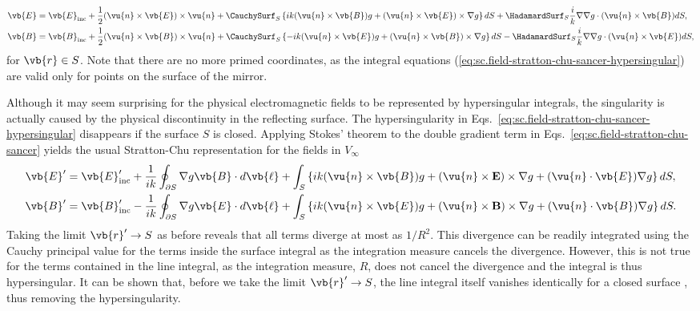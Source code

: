 \documentclass[11pt,SymmetricalJury]{inrsthesis/inrsthesis}
\begin{document}
  \begin{subequations}
  \label{eq:sc.field-stratton-chu-sancer-hypersingular}
  \begin{align}
  \label{eq:sc.efield-stratton-chu-sancer-hypersingular}
  \vb{E} &= \vb{E}_\text{inc}+ \frac{1}{2}(\vu{n}\times\vb{E})\times\vu{n}
          +\CauchySurf_S
            \left\{ ik(\vu{n}\times \vb{B})              g
                    +   (\vu{n}\times \vb{E})\times \nabla g\right\}dS
          +\HadamardSurf_S\frac{i}{k}\nabla\nabla g\cdot(\vu{n}\times\vb{B}) dS,\\
  \label{eq:sc.bfield-stratton-chu-sancer-hypersingular}
  \vb{B}
      &= \vb{B}_\text{inc} + \frac{1}{2}(\vu{n}\times\vb{B})\times\vu{n}
      +\CauchySurf_S
        \left\{-ik(\vu{n}\times \vb{E})g +(\vu{n}\times \vb{B})\times \nabla g\right\}dS
      -\HadamardSurf_S\frac{i}{k}\nabla\nabla g\cdot(\vu{n}\times\vb{E})dS,
  \end{align}
  \end{subequations}
for $\vb{r}\in S$. Note that there are no more primed coordinates, as the integral
equations (\ref{eq:sc.field-stratton-chu-sancer-hypersingular})
are valid only for points on the surface of the mirror.

Although it may seem surprising for the
physical electromagnetic fields to be represented by hypersingular integrals,
the singularity is actually caused by the physical discontinuity in the reflecting surface.
The hypersingularity in Eqs.~\eqref{eq:sc.field-stratton-chu-sancer-hypersingular}
disappears if the surface $S$ is closed. Applying Stokes' theorem to the double gradient
term in Eqs.~\eqref{eq:sc.field-stratton-chu-sancer} yields the usual Stratton-Chu
representation for the fields in $V_\infty$
  \begin{subequations}
  \label{eq:sc.field.stratton-chu}
  \begin{align}
    \vb{E}'   &= \vb{E}_\text{inc}'+\frac{1}{ik}\oint_{\partial S} \nabla g \vb{B}\cdot d\vb{\ell}
                  + \int_S\left\{ ik(\vu{n}\times\vb{B})g
                  + (\vu{n}\times\mathbf{E})\times\nabla g
                  + (\vu{n}\cdot\vb{E})\nabla g
                 \right\} dS, \\
    \vb{B}'   &= \vb{B}_\text{inc}'-\frac{1}{ik}\oint_{\partial S} \nabla g \vb{E}\cdot d\vb{\ell}
                  + \int_S\left\{ ik(\vu{n}\times\vb{E})g
                  + (\vu{n}\times\mathbf{B})\times\nabla g
                  + (\vu{n}\cdot\vb{B})\nabla g
                 \right\} dS.
  \end{align}
  \end{subequations}
Taking the limit $\vb{r}'\rightarrow S$ as before reveals that all terms diverge
at most as $1/R^2$. This divergence can be readily integrated using the Cauchy
principal value for the terms inside the surface integral as the integration
measure cancels the divergence. However, this is not true for the terms contained in the line integral,
as the integration measure, $R$, does not cancel the divergence and the integral
is thus hypersingular. It can be shown that, before we take the limit $\vb{r}'\rightarrow S$,
the line integral itself vanishes identically
for a closed surface \cite{Sancer1968}, thus removing the hypersingularity.
\end{document}
